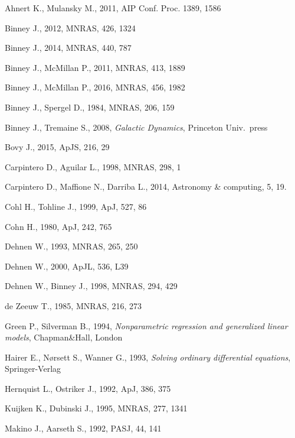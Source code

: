 \documentclass[12pt]{article}
\begin{document}
\newpage
\begin{thebibliography}{99} \setlength{\parskip}{2pt} \setlength{\itemsep}{2pt}

Ahnert K., Mulansky M., 2011, AIP Conf. Proc. 1389, 1586

Binney J., 2012, MNRAS, 426, 1324

Binney J., 2014, MNRAS, 440, 787

Binney J., McMillan P., 2011, MNRAS, 413, 1889

Binney J., McMillan P., 2016, MNRAS, 456, 1982

Binney J., Spergel D., 1984, MNRAS, 206, 159

Binney J., Tremaine S., 2008, \textsl{Galactic Dynamics}, Princeton Univ.\ press

Bovy J., 2015, ApJS, 216, 29

Carpintero D., Aguilar L., 1998, MNRAS, 298, 1

Carpintero D., Maffione N., Darriba L., 2014, Astronomy \& computing, 5, 19.

Cohl H., Tohline J., 1999, ApJ, 527, 86

Cohn H., 1980, ApJ, 242, 765

Dehnen W., 1993, MNRAS, 265, 250

Dehnen W., 2000, ApJL, 536, L39

Dehnen W., Binney J., 1998, MNRAS, 294, 429

de Zeeuw T., 1985, MNRAS, 216, 273

Green P., Silverman B., 1994, \textsl{Nonparametric regression and generalized linear models}, Chapman\&Hall, London

Hairer E., N{\o}rsett S., Wanner G., 1993, \textsl{Solving ordinary differential equations}, Springer-Verlag

Hernquist L., Ostriker J., 1992, ApJ, 386, 375

Kuijken K., Dubinski J., 1995, MNRAS, 277, 1341

Makino J., Aarseth S., 1992, PASJ, 44, 141


\end{thebibliography}
\end{document}
